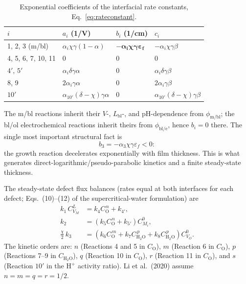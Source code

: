 \begin{table}[htbp]
\centering
\caption{Exponential coefficients of the interfacial rate constants,
Eq.~\eqref{eq:rateconstant}.}
\label{tab:coeffs}
\begin{tabular}{llll}
\toprule
$i$ & $a_i$ (1/V) & $b_i$ (1/cm) & $c_i$ \\
\midrule
1, 2, 3 (m/bl) & $\alpha_i \chi \gamma (1-\alpha)$ &
$\boldsymbol{-\alpha_i \chi \gamma \varepsilon_f}$ &
$-\alpha_i \chi \gamma \beta$ \\
4, 5, 6, 7, 10, 11 & 0 & 0 & 0 \\
$4'$, $5'$ & $\alpha_i \delta \gamma \alpha$ & 0 & $\alpha_i \delta \gamma \beta$ \\
8, 9 & $2 \alpha_i \gamma \alpha$ & 0 & $2 \alpha_i \gamma \beta$ \\
$10'$ & $\alpha_{10'} (\delta-\chi) \gamma \alpha$ & 0 &
$\alpha_{10'} (\delta-\chi) \gamma \beta$ \\
\bottomrule
\end{tabular}
\end{table}

The m/bl reactions inherit their $V$-, $L_{\mathrm{bl}}$-, and pH-dependence
from $\phi_{\mathrm{m/bl}}$; the bl/ol electrochemical reactions inherit theirs
from $\phi_{\mathrm{bl/e}}$, hence $b_i = 0$ there. The single most important
structural fact is
\begin{equation}
b_3 = -\alpha_3 \chi \gamma \varepsilon_f < 0 :
\end{equation}
the growth reaction decelerates exponentially with film thickness. This is
what generates direct-logarithmic/pseudo-parabolic kinetics and a finite
steady-state thickness.

The steady-state defect flux balances (rates equal at both interfaces for each
defect; Eqs.~(10)--(12) of the supercritical-water formulation) are
\begin{align}
k_1\, C_{V_M}^{L} &= k_4 C_{\mathrm{O}}^{\,n} + k_{4'} , \\
k_2 &= \left( k_5 C_{\mathrm{O}}^{\,n} + k_{5'} \right) C_{M_i}^{0} , \\
\frac{\chi}{2}\, k_3 &= \left( k_6 C_{\mathrm{O}}^{\,m}
+ k_7 C_{\mathrm{H_2O}}^{\,p} + k_8 C_{\mathrm{H_2O}}^{\,p} \right) C_{V_O}^{0} .
\end{align}
The kinetic orders are: $n$ (Reactions 4 and 5 in $C_{\mathrm{O}}$),
$m$ (Reaction 6 in $C_{\mathrm{O}}$), $p$ (Reactions 7--9 in
$C_{\mathrm{H_2O}}$), $q$ (Reaction 10 in $C_{\mathrm{O}}$),
$r$ (Reaction 11 in $C_{\mathrm{O}}$), and $s$ (Reaction $10'$ in the
$\mathrm{H^+}$ activity ratio). Li et al.\ (2020) assume $n = m = q = r = 1/2$.

